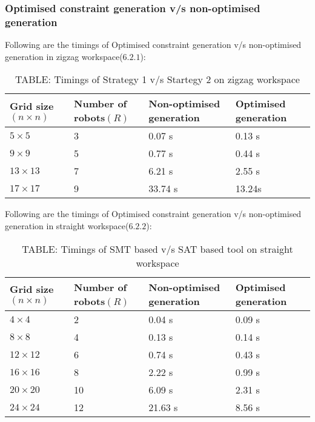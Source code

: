\documentclass{article}[11pt]
\begin{document}
			\subsubsection{Optimised constraint generation v/s non-optimised generation}
			Following are the timings of Optimised constraint generation v/s non-optimised generation in zigzag workspace($6.2.1$):
				\begin{table}[h!]
				\centering
				\begin{tabular}{|| p{2cm} | p{2cm} | p{2cm} | p{2cm} ||} 
				 \hline\hline
				 Grid size$(n \times n)$ & Number of robots$(R)$ & Non-optimised generation & Optimised generation \\ [0.5ex] 
				 \hline\hline
				 $5 \times 5$ & 3 & 0.07 s & 0.13 s\\ 
				 $9 \times 9$ & 5  & 0.77 s & 0.44 s\\
				 $13 \times 13$ & 7  & 6.21 s & 2.55 s\\
				 $17 \times 17$ & 9  & 33.74 s & 13.24s \\ [1ex]
				 \hline
				\end{tabular}
				\caption*{TABLE: Timings of Strategy 1 v/s Startegy 2 on zigzag workspace}
				\end{table}

			Following are the timings of Optimised constraint generation v/s non-optimised generation in straight workspace($6.2.2$):
				\begin{table}[h!]
				\centering
				\begin{tabular}{|| p{2cm} | p{2cm} | p{2cm} | p{2cm} ||} 
				 \hline\hline
				 Grid size$(n \times n)$ & Number of robots$(R)$ & Non-optimised generation & Optimised generation \\ [0.5ex] 
				 \hline\hline
				 $4 \times 4$ & 2 & 0.04 s & 0.09 s\\ 
				 $8 \times 8$ & 4 & 0.13 s & 0.14 s\\
				 $12 \times 12$ & 6 & 0.74 s & 0.43 s\\
				 $16 \times 16$ & 8 & 2.22 s & 0.99 s\\
				 $20 \times 20$ & 10 & 6.09 s & 2.31 s\\
				 $24 \times 24$ & 12 & 21.63 s & 8.56 s\\ [1ex]
				 \hline
				\end{tabular}
				\caption*{TABLE: Timings of SMT based v/s SAT based tool on straight workspace}
				\end{table}
\end{document}
